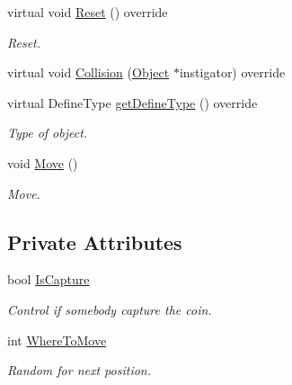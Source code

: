 \begin{DoxyCompactItemize}
virtual void \hyperlink{class_coin_a4fbc44581a02121f6c4e6b93b493175d}{Reset} () override
\begin{DoxyCompactList}\small\item\em Reset. \end{DoxyCompactList}\item 
virtual void \hyperlink{class_coin_aa6b47cadab21693854c2c4f8266a5ac1}{Collision} (\hyperlink{class_object}{Object} $\ast$instigator) override
\item 
\mbox{\label{class_coin_af2b1a914f49d5fcaf5b2c1ce74d5b065}} 
virtual Define\+Type \hyperlink{class_coin_af2b1a914f49d5fcaf5b2c1ce74d5b065}{get\+Define\+Type} () override
\begin{DoxyCompactList}\small\item\em Type of object. \end{DoxyCompactList}\item 
\mbox{\label{class_coin_a599acd6db3cba922df144bad324a1b19}} 
void \hyperlink{class_coin_a599acd6db3cba922df144bad324a1b19}{Move} ()
\begin{DoxyCompactList}\small\item\em Move. \end{DoxyCompactList}\end{DoxyCompactItemize}
\subsection*{Private Attributes}
\begin{DoxyCompactItemize}
\item 
\mbox{\label{class_coin_a4a5f701e25d7c98577af66a3de491946}} 
bool \hyperlink{class_coin_a4a5f701e25d7c98577af66a3de491946}{Is\+Capture}
\begin{DoxyCompactList}\small\item\em Control if somebody capture the coin. \end{DoxyCompactList}\item 
\mbox{\label{class_coin_a7ab98ec00c278f1e4adb0e0988b10cf2}} 
int \hyperlink{class_coin_a7ab98ec00c278f1e4adb0e0988b10cf2}{Where\+To\+Move}
\begin{DoxyCompactList}\small\item\em Random for next position. \end{DoxyCompactList}\end{DoxyCompactItemize}
